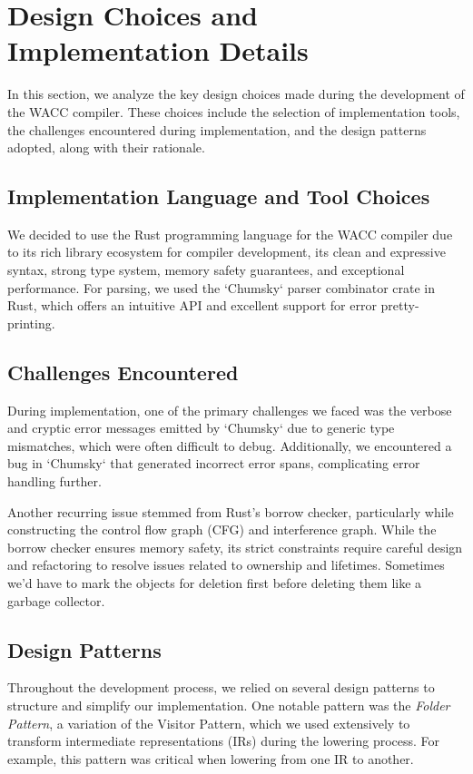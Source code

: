 \documentclass[11pt,a4paper]{article}
\begin{document}
\section{Design Choices and Implementation Details}

In this section, we analyze the key design choices made during the development of the WACC compiler. These choices include the selection of implementation tools, the challenges encountered during implementation, and the design patterns adopted, along with their rationale.

\subsection{Implementation Language and Tool Choices}

We decided to use the Rust programming language for the WACC compiler due to its rich library ecosystem for compiler development, its clean and expressive syntax, strong type system, memory safety guarantees, and exceptional performance. For parsing, we used the `Chumsky` parser combinator crate in Rust, which offers an intuitive API and excellent support for error pretty-printing.

\subsection{Challenges Encountered}

During implementation, one of the primary challenges we faced was the verbose and cryptic error messages emitted by `Chumsky` due to generic type mismatches, which were often difficult to debug. Additionally, we encountered a bug in `Chumsky` that generated incorrect error spans, complicating error handling further.

Another recurring issue stemmed from Rust's borrow checker, particularly while constructing the control flow graph (CFG) and interference graph. While the borrow checker ensures memory safety, its strict constraints require careful design and refactoring to resolve issues related to ownership and lifetimes. Sometimes we'd have to mark the objects for deletion first before deleting them like a garbage collector.

\subsection{Design Patterns}

Throughout the development process, we relied on several design patterns to structure and simplify our implementation. One notable pattern was the \textit{Folder Pattern}, a variation of the Visitor Pattern, which we used extensively to transform intermediate representations (IRs) during the lowering process. For example, this pattern was critical when lowering from one IR to another.
\end{document}
